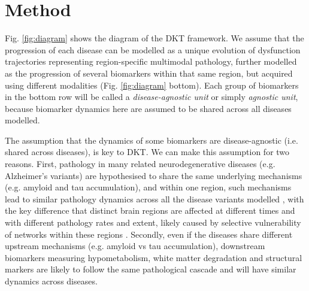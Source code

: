 \documentclass{llncs}
\begin{document}
\section{Method}
\label{sec:method}


\newcommand{\lp}{\lambda_{d_i}^{\psi(k)}}
\newcommand{\lpuu}{\lambda_{d_i}^{\psi(k),(u)}}
\newcommand{\lpum}{\lambda_{d_i}^{\psi(k),(u-1)}}

Fig. \ref{fig:diagram} shows the diagram of the DKT framework. We assume that the progression of each disease can be modelled as a unique evolution of dysfunction trajectories representing region-specific multimodal pathology, further modelled as the progression of several biomarkers within that same region, but acquired using different modalities (Fig. \ref{fig:diagram} bottom). Each group of biomarkers in the bottom row will be called a \emph{disease-agnostic unit} or simply \emph{agnostic unit}, because biomarker dynamics here are assumed to be shared across all diseases modelled.

The assumption that the dynamics of some biomarkers are disease-agnostic (i.e. shared across diseases), is key to DKT. We can make this assumption for two reasons. First, pathology in many related neurodegenerative diseases (e.g. Alzheimer's variants) are hypothesised to share the same underlying mechanisms (e.g. amyloid and tau accumulation), and within one region, such mechanisms lead to similar pathology dynamics across all the disease variants modelled \cite{jack2010hypothetical}, with the key difference that distinct brain regions are affected at different times and with different pathology rates and extent, likely caused by selective vulnerability of networks within these regions \cite{seeley2009neurodegenerative}. Secondly, even if the diseases share different upstream mechanisms (e.g. amyloid vs tau accumulation), downstream biomarkers measuring hypometabolism, white matter degradation and structural markers are likely to follow the same pathological cascade and will have similar dynamics across diseases.

\end{document}
